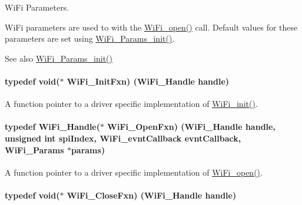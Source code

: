 Wi\+Fi Parameters. 

Wi\+Fi parameters are used to with the \hyperlink{_wi_fi_8h_a74bfb46543ca040aabea15dc58f16e92}{Wi\+Fi\+\_\+open()} call. Default values for these parameters are set using \hyperlink{_wi_fi_8h_a89959d0d9640421ee0b8c68eca240ae0}{Wi\+Fi\+\_\+\+Params\+\_\+init()}.

\begin{DoxySeeAlso}{See also}
\hyperlink{_wi_fi_8h_a89959d0d9640421ee0b8c68eca240ae0}{Wi\+Fi\+\_\+\+Params\+\_\+init()} 
\end{DoxySeeAlso}
\paragraph[{Wi\+Fi\+\_\+\+Init\+Fxn}]{\setlength{\rightskip}{0pt plus 5cm}typedef void($\ast$ Wi\+Fi\+\_\+\+Init\+Fxn) ({\bf Wi\+Fi\+\_\+\+Handle} handle)}\label{_wi_fi_8h_ac7aed5d39515b94dc5b850b366c1c493}


A function pointer to a driver specific implementation of \hyperlink{_wi_fi_8h_a306a67ecbf66c31b31ee62a7170c563c}{Wi\+Fi\+\_\+init()}. 

\paragraph[{Wi\+Fi\+\_\+\+Open\+Fxn}]{\setlength{\rightskip}{0pt plus 5cm}typedef {\bf Wi\+Fi\+\_\+\+Handle}($\ast$ Wi\+Fi\+\_\+\+Open\+Fxn) ({\bf Wi\+Fi\+\_\+\+Handle} handle, unsigned int spi\+Index, {\bf Wi\+Fi\+\_\+evnt\+Callback} evnt\+Callback, {\bf Wi\+Fi\+\_\+\+Params} $\ast$params)}\label{_wi_fi_8h_a8f482785892cfecbe0799e844c2fb389}


A function pointer to a driver specific implementation of \hyperlink{_wi_fi_8h_a74bfb46543ca040aabea15dc58f16e92}{Wi\+Fi\+\_\+open()}. 

\paragraph[{Wi\+Fi\+\_\+\+Close\+Fxn}]{\setlength{\rightskip}{0pt plus 5cm}typedef void($\ast$ Wi\+Fi\+\_\+\+Close\+Fxn) ({\bf Wi\+Fi\+\_\+\+Handle} handle)}\label{_wi_fi_8h_a38017ed0e04ba2fb9a81cd3177c7d7b8}



